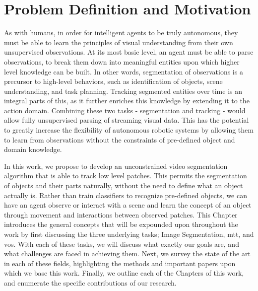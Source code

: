 \section{Problem Definition and Motivation}
As with humans, in order for intelligent agents to be truly autonomous, they must be able to learn the principles of visual understanding from their own unsupervised observations. At its most basic level, an agent must be able to parse observations, to break them down into meaningful entities upon which higher level knowledge can be built. In other words, segmentation of observations is a precursor to high-level behaviors, such as identification of objects, scene understanding, and task planning. Tracking segmented entities over time is an integral parts of this, as it further enriches this knowledge by extending it to the action domain. Combining these two tasks - segmentation and tracking - would allow fully unsupervised parsing of streaming visual data.   This has the potential to greatly increase the flexibility of autonomous robotic systems by allowing them to learn from observations without the constraints of pre-defined object and domain knowledge.

In this work, we propose to develop an unconstrained video segmentation algorithm that is able to track low level patches. This permits the segmentation of objects and their parts naturally, without the need to define what an object actually is. Rather than train classifiers to recognize pre-defined objects, we can have an agent observe or interact with a scene and learn the concept of an object through movement and interactions between observed patches. This Chapter introduces the general concepts that will be expounded upon throughout the work by first discussing the three underlying tasks; Image Segmentation, \acrfull{mtt}, and \acrfull{vos}. With each of these tasks, we will discuss what exactly our goals are, and what challenges are faced in achieving them. Next, we survey the state of the art in each of these fields, highlighting the methods and important papers upon which we base this work. Finally, we outline each of the Chapters of this work, and enumerate the specific contributions of our research.

